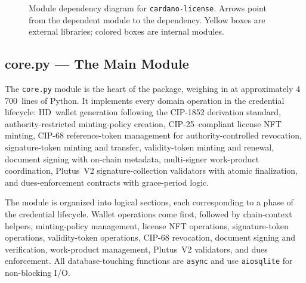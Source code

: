 \begin{figure}[htbp]
\caption{Module dependency diagram for \texttt{cardano-license}.  Arrows
  point from the dependent module to the dependency.  Yellow boxes are
  external libraries; colored boxes are internal modules.}
\label{fig:module-diagram}
\end{figure}

\subsection{core.py --- The Main Module}

The \texttt{core.py} module is the heart of the package, weighing in at
approximately 4\,700~lines of Python.  It implements every domain operation
in the credential lifecycle: HD~wallet generation following the CIP-1852
derivation standard, authority-restricted minting-policy creation,
CIP-25--compliant license NFT minting, CIP-68 reference-token management
for authority-controlled revocation, signature-token minting and transfer,
validity-token minting and renewal, document signing with on-chain metadata,
multi-signer work-product coordination, Plutus~V2 signature-collection
validators with atomic finalization, and dues-enforcement contracts with
grace-period logic.

The module is organized into logical sections, each corresponding to a phase
of the credential lifecycle.  Wallet operations come first, followed by
chain-context helpers, minting-policy management, license NFT operations,
signature-token operations, validity-token operations, CIP-68 revocation,
document signing and verification, work-product management, Plutus~V2
validators, and dues enforcement.  All database-touching functions are
\texttt{async} and use \texttt{aiosqlite} for non-blocking I/O.

